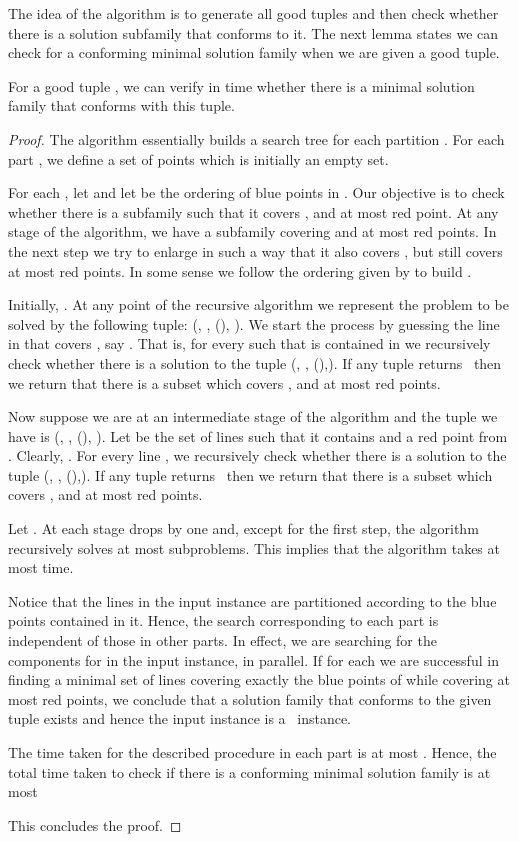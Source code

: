 The idea of the algorithm is to generate all good tuples and then check whether there is a 
solution subfamily  that conforms to it. The next lemma states we can check for a conforming minimal solution family when we are given a good tuple. 
\begin{lem}\label{good_tuples}
 For a good tuple , 
we can verify in  time whether there is a minimal solution family  that conforms with this tuple.
\end{lem}

\begin{proof}
The algorithm essentially builds a search tree for each partition . For each part , we define a set of points  which is initially an empty set. 




For each , let  and let   be the ordering of blue points in . Our objective is to check whether there is a subfamily  such that it covers , and at most  red point. At any stage of the algorithm, we have a subfamily  covering  
 and at most  red points. In the next step we try to enlarge   in such a way 
that it also covers , but still covers at most  red points. In some sense we follow the ordering given by  to build . 

Initially, 
. At any point of the recursive algorithm we represent the problem to be solved by the following tuple: 
(, , (), ). 
We start the process by guessing the line in  that covers , say . That is, for every  such that 
 is contained in  we recursively check whether there is a solution to the tuple 
 (, , (),).  If any tuple returns \YES\ then we return that there is a subset  which covers , and at most  red points. 

Now suppose we are at an intermediate stage of the algorithm and the tuple we have is (, , (), ). Let  be the set of lines such that it contains  and a red point from . Clearly, . For every line , we  recursively check whether there is a solution to the tuple (, , (),).  If any tuple returns \YES\ then we return that there is a subset  which covers , and at most  red points. 

Let .  At each stage  drops by one and, except for the first step, the algorithm recursively solves at most  subproblems. This implies that the algorithm takes at most  time.  




Notice that the lines in the input instance are partitioned according to the blue points contained in it. Hence, the search corresponding to each part  is independent of those in other parts. In effect, we are searching for the components for  in the input instance, in parallel. If for each  we are successful in finding a minimal set of lines covering exactly the blue points of  while covering at most  red points, we conclude that a solution family  that conforms to the given tuple exists and hence the input instance is a \YES\ instance.

The time taken for the described procedure in each part is at most . Hence, the total time taken to check if there is a conforming minimal solution family  is at most 
 
This concludes the proof. 
\end{proof}


